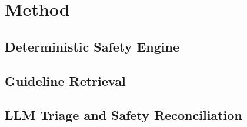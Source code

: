 \section{Method}\label{sec:method}

\subsection{Deterministic Safety Engine}
\subsection{Guideline Retrieval}
\subsection{LLM Triage and Safety Reconciliation}

